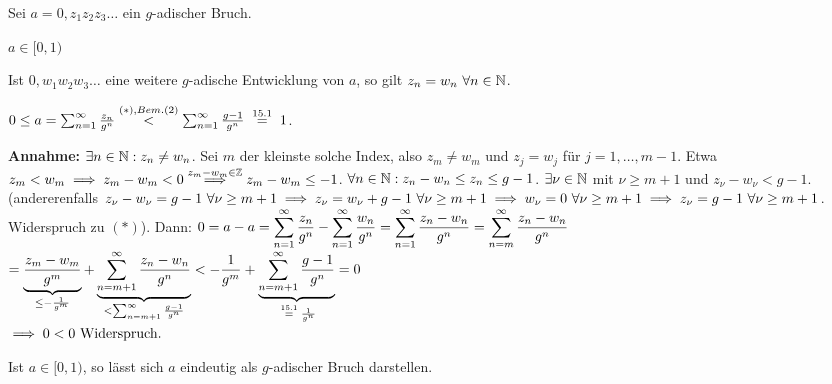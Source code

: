\documentclass[a4paper,twoside,DIV15,BCOR12mm]{scrbook}
\begin{document}
\begin{satz}
Sei $a=0,z_1z_2z_3\ldots$ ein $g$-adischer Bruch.
\begin{liste}
\item $a\in[0,1)$
\item Ist $0,w_1w_2w_3\ldots$ eine weitere $g$-adische Entwicklung von $a$, so gilt $z_n = w_n \ \forall n\in\mathbb{N}$.
\end{liste}
\end{satz}

\begin{beweise}
\item $0 \le a = \reihe{\frac{z_n}{g^n}} \stackrel{\text{($*$)}, Bem. (2)}{<} \reihe{\frac{g-1}{g^n}} \gleichnach{15.1} 1$.
\item \textbf{Annahme:} $\exists n\in\mathbb{N}: z_n \ne w_n$. Sei $m$ der kleinste solche Index, also $z_m \ne w_m$ und $z_j = w_j$ für $j=1,\ldots ,m-1$. Etwa $z_m < w_m \implies z_m - w_m < 0 \overset{z_m - w_m \in\mathbb{Z}}{\implies} z_m - w_m \le -1$. $\forall n\in\mathbb{N}: z_n - w_n \le z_n \le g-1$. $\exists \nu \in\mathbb{N}$ mit $\nu \ge m+1$ und $z_\nu - w_\nu < g-1$. (andererenfalls $z_\nu - w_\nu = g-1 \ \forall \nu \ge m+1 \implies z_\nu = w_\nu + g-1 \ \forall \nu \ge m+1 \implies w_\nu = 0 \ \forall \nu \ge m+1 \implies z_\nu = g-1 \ \forall \nu \ge m+1$. Widerspruch zu $(*)$). Dann: 
$\displaystyle{0 = a-a = \sum_{n=1}^{\infty}{\frac{z_n}{g^n}} - \sum_{n=1}^{\infty}{\frac{w_n}{g^n}} = \sum_{n=1}^{\infty}{\frac{z_n - w_n}{g^n}} = \sum_{n=m}^\infty{\frac{z_n - w_n}{g^n}}}$\\
$\displaystyle{= \underbrace{\frac{z_m - w_m}{g^m}}_{\le -\frac{1}{g^m}} + \underbrace{\sum_{n=m+1}^\infty{\frac{z_n-w_n}{g^n}}}_{< \sum_{n=m+1}^\infty{\frac{g-1}{g^n}}} < - \frac{1}{g^m} + \underbrace{\sum_{n=m+1}^\infty{\frac{g-1}{g^n}}}_{\gleichnach{15.1} \frac{1}{g^n}} = 0}$\\
$\implies 0<0 \text{  Widerspruch.}$
\end{beweise}

\begin{satz}
Ist $a\in[0,1)$, so lässt sich $a$ eindeutig als $g$-adischer Bruch darstellen.
\end{satz}
\end{document}
